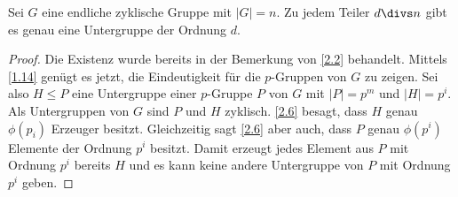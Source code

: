 \begin{nt*}
	Sei $G$ eine endliche zyklische Gruppe mit $|G| = n$.
	Zu jedem Teiler $d \divs n$ gibt es genau eine Untergruppe der Ordnung $d$.
	\begin{proof}
		Die Existenz wurde bereits in der Bemerkung von \ref{2.2} behandelt.
		Mittels \ref{1.14} genügt es jetzt, die Eindeutigkeit für die $p$-Gruppen von $G$ zu zeigen.
		Sei also $H \le P$ eine Untergruppe einer $p$-Gruppe $P$ von $G$ mit $|P| = p^m$ und $|H| = p^i$.
		Als Untergruppen von $G$ sind $P$ und $H$ zyklisch.
		\ref{2.6} besagt, dass $H$ genau $\phi(p_i)$ Erzeuger besitzt.
		Gleichzeitig sagt \ref{2.6} aber auch, dass $P$ genau $\phi(p^i)$ Elemente der Ordnung $p^i$ besitzt.
		Damit erzeugt jedes Element aus $P$ mit Ordnung $p^i$ bereits $H$ und es kann keine andere Untergruppe von $P$ mit Ordnung $p^i$ geben.
	\end{proof}
\end{nt*}

